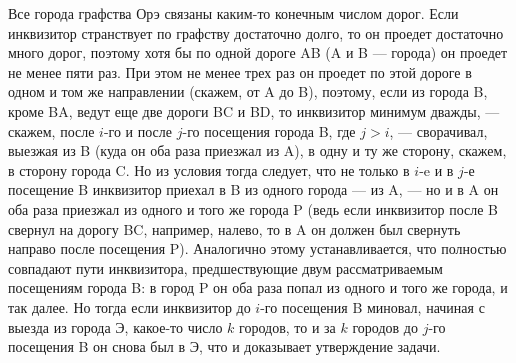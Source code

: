 \documentclass{article}
\begin{document}
Все города графства Орэ связаны каким-то конечным числом дорог. Если инквизитор странствует по графству достаточно долго, то он проедет достаточно много дорог, поэтому хотя бы по одной дороге AB (A и B --- города) он проедет не менее пяти раз. При этом не менее трех раз он проедет по этой дороге в одном и том же направлении (скажем, от A до B), поэтому, если из города B, кроме BA, ведут еще две дороги BC и BD, то инквизитор минимум дважды, --- скажем, после $i$-го и после $j$-го посещения города B, где $j>i$, --- сворачивал, выезжая из B (куда он оба раза приезжал из A), в одну и ту же сторону, скажем, в сторону города C. Но из условия тогда следует, что не только в $i$-e и в $j$-е посещение B инквизитор приехал в B из одного города --- из A, --- но и в A он оба раза приезжал из одного и того же города P (ведь если инквизитор после B свернул на дорогу BC, например, налево, то в A он должен был свернуть направо после посещения P). Аналогично этому устанавливается, что полностью совпадают пути инквизитора, предшествующие двум рассматриваемым посещениям города B: в город P он оба раза попал из одного и того же города, и так далее. Но тогда если инквизитор до $i$-го посещения B миновал, начиная с выезда из города Э, какое-то число $k$ городов, то и за $k$ городов до $j$-го посещения B он снова был в Э, что и доказывает утверждение задачи.
\end{document}
